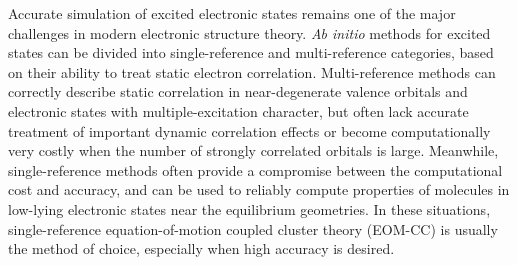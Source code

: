 Accurate simulation of excited electronic states remains one of the major
challenges in modern electronic structure theory. 
{\it Ab initio}\/ methods for excited states can be divided into
single-reference and multi-reference categories, based on their ability to
treat static electron correlation.
Multi-reference methods 
\cite{Knowles:1985p259,Wolinski:1987p225,Hirao:1992p374,Finley:1998p299,Andersson:1990p5483,Andersson:1992p1218,Angeli:2001p10252,Angeli:2001p297,Mukherjee:1977p955,Jeziorski:1981p1668,Werner:1988p5803,Mahapatra:1998p157,Pittner:2003p10876,Evangelista:2007p024102,Datta:2011p214116,Evangelista:2011p114102,Kohn:2013p176,Nooijen:2014p081102}
can correctly describe static correlation in
near-degenerate valence orbitals and electronic states with multiple-excitation
character, but often lack accurate treatment of important dynamic correlation
effects
or become computationally very costly when the number of strongly correlated orbitals is large.
Meanwhile,
single-reference methods
\cite{Foresman:1992p135,Sherrill:1999p143,Geertsen:1989p57,Comeau:1993p414,Stanton:1993p7029,Krylov:2008p433,Crawford:2000p33,Shavitt:2009,Sekino:1984p255,Koch:1990p3345,Koch:1990p3333,Nooijen:1997p6441,Nooijen:1997p6812,Nakatsuji:1978p2053,Nakatsuji:1979p329}
often provide a compromise between the computational
cost and accuracy, and can be used to reliably compute properties of molecules
in low-lying electronic states near the equilibrium geometries. In these
situations, single-reference equation-of-motion coupled cluster theory
(EOM-CC)
\cite{Geertsen:1989p57,Comeau:1993p414,Stanton:1993p7029,Krylov:2008p433,Crawford:2000p33,Shavitt:2009}
is usually the method of choice, especially when high accuracy
is desired. 


